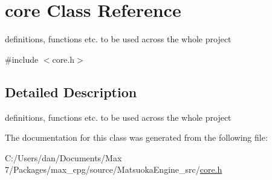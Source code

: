 \hypertarget{classcore}{}\section{core Class Reference}
\label{classcore}


definitions, functions etc. to be used across the whole project  




{\ttfamily \#include $<$core.\+h$>$}



\subsection{Detailed Description}
definitions, functions etc. to be used across the whole project 

The documentation for this class was generated from the following file\+:\begin{DoxyCompactItemize}
\item 
C\+:/\+Users/dan/\+Documents/\+Max 7/\+Packages/max\+\_\+cpg/source/\+Matsuoka\+Engine\+\_\+src/\hyperlink{core_8h}{core.\+h}\end{DoxyCompactItemize}
